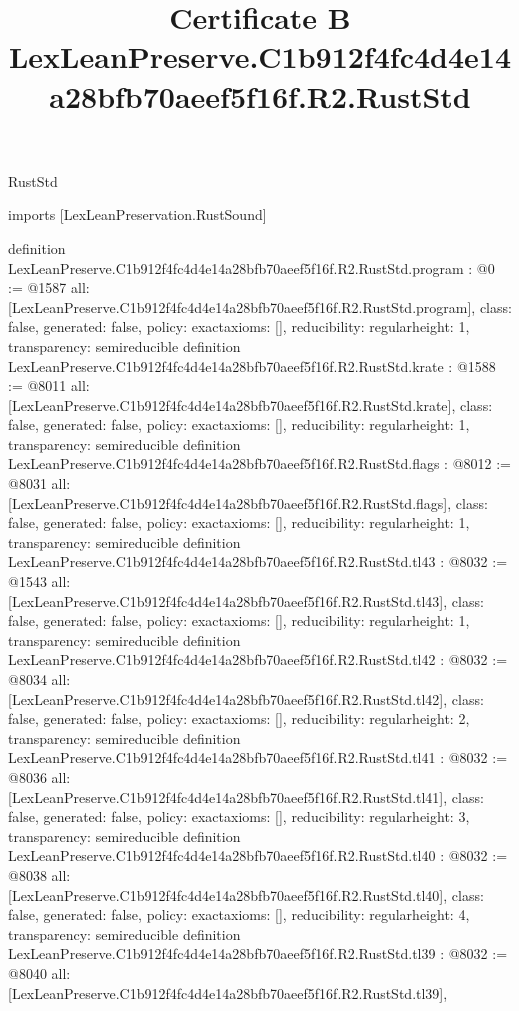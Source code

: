 \begin{lexlean}{RustStd}
\title{Certificate B LexLeanPreserve.C1b912f4fc4d4e14a28bfb70aeef5f16f.R2.RustStd}
\begin{coremodule}
imports [LexLeanPreservation.RustSound]

definition LexLeanPreserve.C1b912f4fc4d4e14a28bfb70aeef5f16f.R2.RustStd.program : @0 := @1587 {
  all: [LexLeanPreserve.C1b912f4fc4d4e14a28bfb70aeef5f16f.R2.RustStd.program],
  class: false,
  generated: false,
  policy: exact{axioms: []},
  reducibility: regular{height: 1},
  transparency: semireducible
}
definition LexLeanPreserve.C1b912f4fc4d4e14a28bfb70aeef5f16f.R2.RustStd.krate : @1588 := @8011 {
  all: [LexLeanPreserve.C1b912f4fc4d4e14a28bfb70aeef5f16f.R2.RustStd.krate],
  class: false,
  generated: false,
  policy: exact{axioms: []},
  reducibility: regular{height: 1},
  transparency: semireducible
}
definition LexLeanPreserve.C1b912f4fc4d4e14a28bfb70aeef5f16f.R2.RustStd.flags : @8012 := @8031 {
  all: [LexLeanPreserve.C1b912f4fc4d4e14a28bfb70aeef5f16f.R2.RustStd.flags],
  class: false,
  generated: false,
  policy: exact{axioms: []},
  reducibility: regular{height: 1},
  transparency: semireducible
}
definition LexLeanPreserve.C1b912f4fc4d4e14a28bfb70aeef5f16f.R2.RustStd.tl43 : @8032 := @1543 {
  all: [LexLeanPreserve.C1b912f4fc4d4e14a28bfb70aeef5f16f.R2.RustStd.tl43],
  class: false,
  generated: false,
  policy: exact{axioms: []},
  reducibility: regular{height: 1},
  transparency: semireducible
}
definition LexLeanPreserve.C1b912f4fc4d4e14a28bfb70aeef5f16f.R2.RustStd.tl42 : @8032 := @8034 {
  all: [LexLeanPreserve.C1b912f4fc4d4e14a28bfb70aeef5f16f.R2.RustStd.tl42],
  class: false,
  generated: false,
  policy: exact{axioms: []},
  reducibility: regular{height: 2},
  transparency: semireducible
}
definition LexLeanPreserve.C1b912f4fc4d4e14a28bfb70aeef5f16f.R2.RustStd.tl41 : @8032 := @8036 {
  all: [LexLeanPreserve.C1b912f4fc4d4e14a28bfb70aeef5f16f.R2.RustStd.tl41],
  class: false,
  generated: false,
  policy: exact{axioms: []},
  reducibility: regular{height: 3},
  transparency: semireducible
}
definition LexLeanPreserve.C1b912f4fc4d4e14a28bfb70aeef5f16f.R2.RustStd.tl40 : @8032 := @8038 {
  all: [LexLeanPreserve.C1b912f4fc4d4e14a28bfb70aeef5f16f.R2.RustStd.tl40],
  class: false,
  generated: false,
  policy: exact{axioms: []},
  reducibility: regular{height: 4},
  transparency: semireducible
}
definition LexLeanPreserve.C1b912f4fc4d4e14a28bfb70aeef5f16f.R2.RustStd.tl39 : @8032 := @8040 {
  all: [LexLeanPreserve.C1b912f4fc4d4e14a28bfb70aeef5f16f.R2.RustStd.tl39],
}
\end{coremodule}
\end{lexlean}
